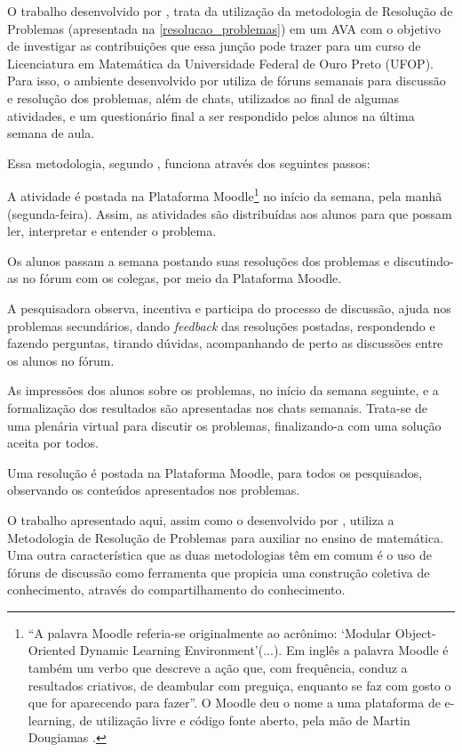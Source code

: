 O trabalho desenvolvido por , trata da utilização da metodologia de Resolução de Problemas (apresentada na \autoref{resolucao_problemas}) em um AVA com o objetivo de 
investigar as contribuições que essa jun\c{c}\~ao pode trazer para um curso de Licenciatura em Matem\'atica da Universidade Federal de Ouro Preto (UFOP). Para isso, 
o ambiente desenvolvido por  utiliza de fóruns semanais para discussão e resolução dos problemas, além de chats, utilizados ao final de algumas atividades, e um 
questionário final a ser respondido pelos alunos na última semana de aula.

Essa metodologia, segundo , funciona atrav\'es dos seguintes passos:
\begin{alineascomnumero}
	\item A atividade é postada na Plataforma Moodle\footnote{``A  palavra  Moodle  referia-se  originalmente  ao  acrônimo:  `Modular Object-Oriented  Dynamic  Learning  Environment'(...).  Em  inglês  a  palavra Moodle é também um verbo que descreve a ação que, com frequência, conduz a resultados criativos, de deambular com preguiça, enquanto se faz com gosto o  que  for  aparecendo  para  fazer''. O  Moodle  deu  o  nome  a  uma  plataforma  de  e-learning,  de  utilização livre  e  código  fonte  aberto,  pela  mão  de  Martin  Dougiamas \cite{oro29585}.} no início da semana, pela manhã (segunda-feira).  Assim,  as  atividades  são  distribuídas  aos  alunos  para  que possam ler, interpretar e entender o problema. 
	\item Os  alunos  passam a  semana  postando  suas  resoluções  dos  problemas e discutindo-as no fórum com os colegas, por meio da Plataforma Moodle. 
	\item A  pesquisadora  observa,  incentiva  e  participa  do  processo  de discussão, ajuda nos problemas secundários, dando \textit{feedback} das resoluções postadas, respondendo e fazendo 
perguntas, tirando  dúvidas, acompanhando de perto as discussões entre os alunos no fórum.
	\item As impressões dos alunos sobre os problemas, no início da semana seguinte, e a formalização dos resultados são apresentadas nos chats semanais. Trata-se  de  uma  plenária  virtual  para  discutir  os  problemas,  finalizando-a  com  uma solução aceita por todos. 
	\item Uma resolução é postada na Plataforma Moodle, para todos os pesquisados, observando os conteúdos apresentados nos problemas. 
\end{alineascomnumero}

O trabalho apresentado aqui, assim como o desenvolvido por , utiliza a Metodologia de Resolu\c{c}\~ao de Problemas para auxiliar no ensino de matem\'atica. Uma 
outra característica que as duas metodologias t\^em em comum \'e o uso de f\'oruns de discuss\~ao como ferramenta que propicia uma 
constru\c{c}\~ao coletiva de conhecimento, atrav\'es do compartilhamento do conhecimento.
